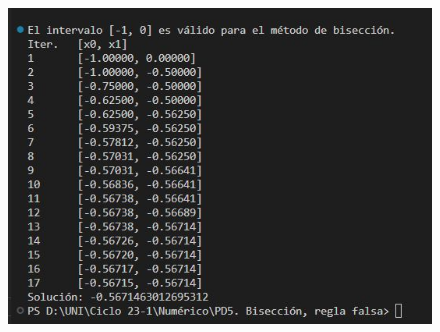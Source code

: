 \begin{frame}
	\begin{solution}

		\begin{figure}
			\includegraphics[width=0.5\paperwidth]{p14_bisection_execution.jpg}
		\end{figure}
	\end{solution}
\end{frame}